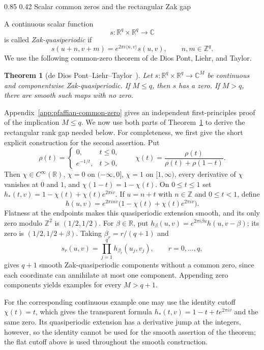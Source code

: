 \documentclass[11pt,reqno]{amsart}
\makeatletter
\numberwithin{equation}{section}
\renewcommand\subsection{\@startsection{subsection}{2}{\z@}%
  {0.85\baselineskip \@plus 0.25\baselineskip \@minus 0.10\baselineskip}%
  {0.42\baselineskip}%
  {\normalfont\bfseries}}
\newtheorem{theorem}{Theorem}[section]
\theoremstyle{definition}
\theoremstyle{remark}
\newcommand{\R}{\mathbb R}
\newcommand{\Z}{\mathbb Z}
\newcommand{\C}{\mathbb C}
\newcommand{\ip}[2]{\langle #1,#2\rangle}
\makeatother
\begin{document}
\subsection{Scalar common zeros and the rectangular Zak gap}
\label{sec:rectangular-common-zero}

A continuous scalar function
\[
 s:\R^q\times\R^q\longrightarrow\C
\]
is called \emph{Zak-quasiperiodic} if
\begin{equation}\label{eq:standard-zak-quasi}
 s(u+n,v+m)=e^{2\pi i\ip{n}{v}}s(u,v)
 ,\qquad n,m\in\Z^q.
\end{equation}
We use the following common-zero theorem of de Dios Pont, Liehr, and Taylor.

\begin{theorem}[de Dios Pont--Liehr--Taylor~\protect\cite{deDiosLiehrTaylor2026}]
\label{thm:ddlt-common-zero}
Let $s:\R^q\times\R^q\to\C^M$ be continuous and componentwise Zak-quasiperiodic.  If $M\le q$, then $s$ has a zero.  If $M>q$, there are smooth such maps with no zero.
\end{theorem}

Appendix~\ref{app:pfaffian-common-zero} gives an independent
first-principles proof of the implication $M\le q$.  We now use both parts of
Theorem~\ref{thm:ddlt-common-zero} to derive the rectangular rank gap needed
below.  For completeness, we first give the short explicit construction for
the second assertion.
Put
\[
 \rho(t)=\begin{cases}0,&t\le0,\\ e^{-1/t},&t>0,\end{cases}
 \qquad
 \chi(t)=\frac{\rho(t)}{\rho(t)+\rho(1-t)}.
\]
Then $\chi\in C^\infty(\R)$, $\chi=0$ on $(-\infty,0]$, $\chi=1$ on
$[1,\infty)$, every derivative of $\chi$ vanishes at $0$ and $1$, and
$\chi(1-t)=1-\chi(t)$.  On $0\le t\le1$ set
$h_*(t,v)=1-\chi(t)+\chi(t)e^{2\pi iv}$.  If $u=n+t$ with $n\in\Z$ and
$0\le t<1$, define
\[
 h(u,v)=e^{2\pi inv}\bigl(1-\chi(t)+\chi(t)e^{2\pi iv}\bigr).
\]
Flatness at the endpoints makes this quasiperiodic extension smooth, and its
only zero modulo $\Z^2$ is $(1/2,1/2)$.  For $\beta\in\R$, put
$h_\beta(u,v)=e^{2\pi i\beta u}h(u,v-\beta)$; its zero is
$(1/2,1/2+\beta)$.  Taking $\beta_r=r/(q+1)$ and
\[
 s_r(u,v)=\prod_{j=1}^q h_{\beta_r}(u_j,v_j),\qquad r=0,\ldots,q,
\]
gives $q+1$ smooth Zak-quasiperiodic components without a common zero,
since each coordinate can annihilate at most one component.  Appending zero components yields examples for every $M>q+1$.

For the corresponding continuous example one may use the identity cutoff
$\chi(t)=t$, which gives the transparent formula
$h_*(t,v)=1-t+te^{2\pi iv}$ and the same zero.  Its quasiperiodic extension
has a derivative jump at the integers, however, so the identity cannot be
used for the smooth assertion of the theorem; the flat cutoff above is used
throughout the smooth construction.
\end{document}
